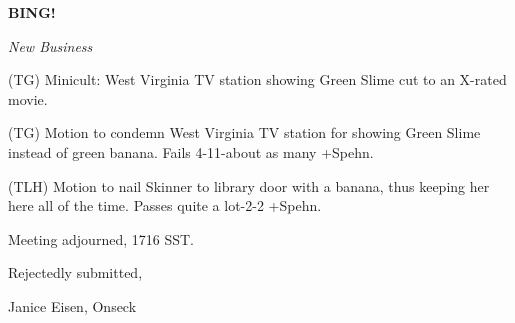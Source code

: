 \documentclass[12pt]{article}
\newcommand{\bing}{{\bf BING!} }
\newcommand{\goto}[1]{\bing \vskip 12pt \centerline{{\em{#1}}}}
\begin{document}
\goto{New Business}

(TG) Minicult: West Virginia TV station showing Green Slime cut to an X-rated movie.

(TG) Motion to condemn West Virginia TV station for showing Green Slime instead of green banana. Fails 4-11-about as many +Spehn.

(TLH) Motion to nail Skinner to library door with a banana, thus keeping her here all of the time. Passes quite a lot-2-2 +Spehn.

\vspace{12pt}

\noindent
Meeting adjourned, 1716 SST.

\vspace{18pt}

\centerline{Rejectedly submitted,}
\centerline{Janice Eisen, Onseck}
\end{document}
